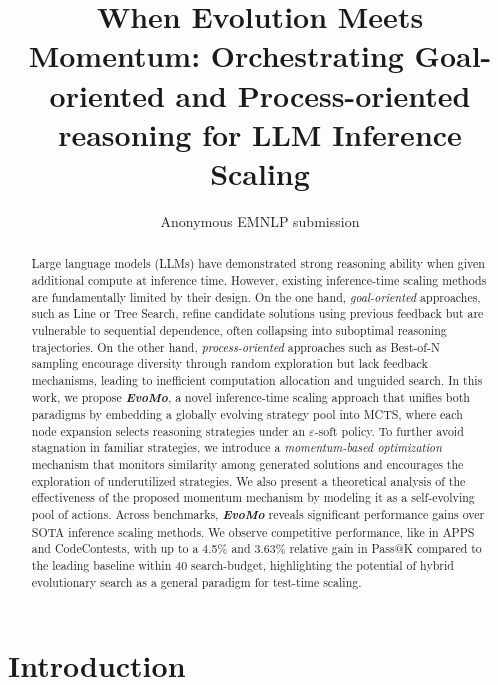 \documentclass[11pt]{article}
\title{When Evolution Meets Momentum: Orchestrating Goal-oriented and Process-oriented reasoning for LLM Inference Scaling}
\author{Anonymous EMNLP submission}
\theoremstyle{definition}
\theoremstyle{remark}
\begin{document}
\maketitle

\begin{abstract}





Large language models (LLMs) have demonstrated strong reasoning ability when given additional compute at inference time. However, existing inference-time scaling methods are fundamentally limited by their design. On the one hand, \textit{goal-oriented} approaches, such as Line or Tree Search, refine candidate solutions using previous feedback but are vulnerable to sequential dependence, often collapsing into suboptimal reasoning trajectories. On the other hand, \textit{process-oriented} approaches such as Best-of-N sampling encourage diversity through random exploration but lack feedback mechanisms, leading to inefficient computation allocation and unguided search. In this work, we propose \textbf{\textit{EvoMo}}, a novel inference-time scaling approach that unifies both paradigms by embedding a globally evolving strategy pool into MCTS, where each node expansion selects reasoning strategies under an $\varepsilon$-soft policy. To further avoid stagnation in familiar strategies, we introduce a \textit{momentum-based optimization} mechanism that monitors similarity among generated solutions and encourages the exploration of underutilized strategies. We also present a theoretical analysis of the effectiveness of the proposed momentum mechanism by modeling it as a self-evolving pool of actions. Across benchmarks, \textbf{\textit{EvoMo}} reveals significant performance gains over SOTA inference scaling methods. We observe competitive performance, like in APPS and CodeContests, with up to a 4.5\% and 3.63\% relative gain in Pass@K compared to the leading baseline within 40 search-budget, highlighting the potential of hybrid evolutionary search as a general paradigm for test-time scaling.


\end{abstract}
\section{Introduction}
\label{intro}
\end{document}

